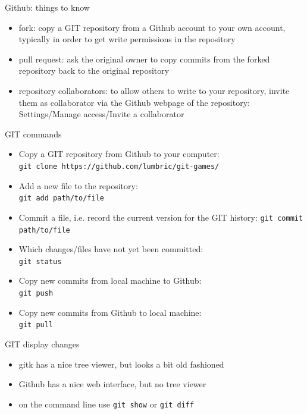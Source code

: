 \begin{frame}[fragile]{Github: things to know}
    \begin{itemize}
        \item fork: copy a GIT repository from a Github account to your own account, typically in
            order to get write permissions in the repository
        \item pull request: ask the original owner to copy commits from the forked repository
            back to the original repository
        \item repository collaborators: to allow others to write to your repository,
            invite them as collaborator via the Github webpage of the repository:\\
            Settings/Manage access/Invite a collaborator
    \end{itemize}
\end{frame}


\begin{frame}[fragile]{GIT commands}
    \begin{itemize}
        \item Copy a GIT repository from Github to your computer:\\
            \verb|git clone https://github.com/lumbric/git-games/|
        \item Add a new file to the repository:\\
            \verb|git add path/to/file|
        \item Commit a file, i.e. record the current version for the GIT history:
            \verb|git commit path/to/file|
        \item Which changes/files have not yet been committed:\\
            \verb|git status|
        \item Copy new commits from local machine to Github:\\
            \verb|git push|
        \item Copy new commits from Github to local machine:\\
            \verb|git pull|
    \end{itemize}
\end{frame}


\begin{frame}[fragile]{GIT display changes}
    \begin{itemize}
        \item gitk has a nice tree viewer, but looks a bit old fashioned
        \item Github has a nice web interface, but no tree viewer
        \item on the command line use \verb|git show| or \verb|git diff|
    \end{itemize}
\end{frame}


